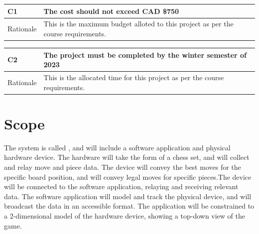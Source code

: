 \documentclass[12pt]{article}
\begin{document}
\begin{table}[H]
  \centering
      \setlength{\leftmargini}{0.4cm}
      \begin{tabular}{| >{\centering\arraybackslash}m{3cm} | 
        >{\centering\arraybackslash}m{12cm} |}
      \hline
      \rowcolor[gray]{0.9}
      C1 & The cost should not exceed CAD \$750\\
      \hline 
      Rationale & This is the maximum budget alloted to this project as per the course requirements.\\
      \hline 
      \end{tabular}
  \label{Table}
  \end{table}
  
\begin{table}[H]
  \centering
      \setlength{\leftmargini}{0.4cm}
      \begin{tabular}{| >{\centering\arraybackslash}m{3cm} | 
        >{\centering\arraybackslash}m{12cm} |}
      \hline
      \rowcolor[gray]{0.9}
      C2 & The project must be completed by the winter semester of 2023\\
      \hline 
      Rationale & This is the allocated time for this project as per the course requirements.\\
      \hline 
      \end{tabular}
  \label{Table}
  \end{table}  

\section{Scope}
{The system is called \progname{}, and will include a software application and physical hardware device. The hardware will take the 
form of a chess set, and will collect and relay move and piece data. The device will convey the best moves for the specific board 
position, and will convey legal moves for specific pieces.The device will be connected to the software application, relaying and 
receiving relevant data. The software application will model and track the physical device, and will broadcast the data in an accessible 
format. The application will be constrained to a 2-dimensional model of the hardware device, showing a top-down view of the game.}
\end{document}
